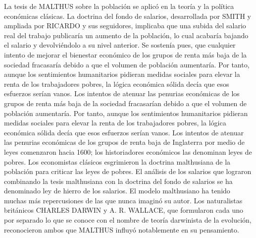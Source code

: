 \documentclass[10pt,a4paper]{article}
\begin{document}
La tesis de MALTHUS sobre la población se aplicó en la teoría y la política económicas clásicas. La doctrina del fondo de salarios, desarrollada por SMITH y ampliada por RICARDO y sus seguidores, implicaba que una subida del salario real del trabajo publicaría un aumento de la población, lo cual acabaría bajando el salario y devolviéndolo a su nivel anterior. Se sostenía pues, que cualquier intento de mejorar el bienestar económico de los grupos de renta más baja de la sociedad fracasaría debido a que el volumen de población aumentaría. Por tanto, aunque los sentimientos humanitarios pidieran medidas sociales para elevar la renta de los trabajadores pobres, la lógica económica sólida decía que esos esfuerzos serían vanos. Los intentos de atenuar las penurias económicas de los grupos de renta más baja de la sociedad fracasarían debido a que el volumen de población aumentaría. Por tanto, aunque los sentimientos humanitarios pidieran medidas sociales para elevar la renta de los trabajadores pobres, la lógica económica sólida decía que esos esfuerzos serían vanos. Los intentos de atenuar las penurias económicas de los grupos de renta baja de Inglaterra por medio de leyes comenzaron hacia 1600; los historiadores económicos las denominan leyes de pobres. Los economistas clásicos esgrimieron la doctrina malthusiana de la población para criticar las leyes de pobres. El análisis de los salarios que lograron combinando la tesis malthusiana con la doctrina del fondo de salarios se ha denominado ley de hierro de los salarios. El modelo malthusiano ha tenido muchas más repercusiones de las que nunca imaginó su autor. Los naturalistas británicos CHARLES DARWIN y A. R. WALLACE, que formularon cada uno por separado lo que se conoce con el nombre de teoría darwinista de la evolución, reconocieron ambos que MALTHUS influyó notablemente en su pensamiento.
\end{document}

